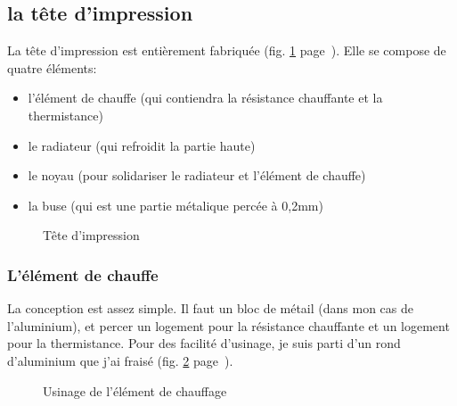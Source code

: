 \subsection{la tête d'impression}
La tête d'impression est entièrement fabriquée (fig. \ref{tete_impression} %
page~\pageref{tete_impression}). Elle se compose de quatre éléments:%
\begin{itemize}%
\item{l'élément de chauffe (qui contiendra la résistance chauffante et la thermistance)}%
\item{le radiateur (qui refroidit la partie haute)}%
\item{le noyau (pour solidariser le radiateur et l'élément de chauffe)}%
\item{la buse (qui est une partie métalique percée à 0,2mm)}%
\end{itemize}%
\begin{figure}%
   \caption{\label{tete_impression} Tête d'impression}%
\end{figure}%
\subsubsection{L'élément de chauffe}%
La conception est assez simple. Il faut un bloc de métail (dans mon cas de l'aluminium), et%
percer un logement pour la résistance chauffante et un logement pour la thermistance.%
Pour des facilité d'usinage, je suis parti d'un rond d'aluminium que j'ai fraisé %
(fig. \ref{usinage_chauffe} page~\pageref{usinage_chauffe}).%
\begin{figure}%
   \caption{\label{usinage_chauffe} Usinage de l'élément de chauffage}%
\end{figure}%
